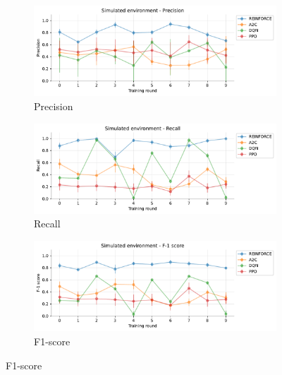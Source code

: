 \documentclass[a4paper, 12pt]{article}
\begin{document}
\begin{figure}[!htbp]
	\begin{subfigure}{\textwidth}
		\centering
		\includegraphics[width=\linewidth]{Simulated_Pr.pdf}  
		\caption{Precision}
		\label{fig:tr-sim-pr}
	\end{subfigure} \par\smallskip
	
	\begin{subfigure}{\textwidth}
		\centering
		\includegraphics[width=\linewidth]{Simulated_Rc.pdf}  
		\caption{Recall}
		\label{fig:tr-sim-rc}
	\end{subfigure} \par\smallskip
	
	\begin{subfigure}{\textwidth}
		\centering
		\includegraphics[width=\linewidth]{Simulated_F1.pdf}  
		\caption{F1-score}
		\label{fig:tr-sim-f1}
	\end{subfigure} \par\smallskip
	

\end{figure}
\end{document}
